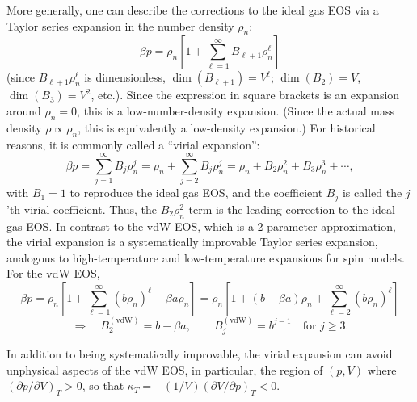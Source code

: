 More generally, one can describe the corrections to the ideal gas EOS via a Taylor series expansion in the number
density $\rho_n$:
\begin{equation}
  \beta p = \rho_n\left[1 + \sum_{\ell=1}^\infty B_{\ell+1}\rho_n^\ell\right]
\end{equation}
(since $B_{\ell+1}\rho_n^\ell$ is dimensionless, $\dim(B_{\ell+1}) = V^\ell$; $\dim(B_2) = V$, $\dim(B_3) = V^2$,
etc.). Since the expression in square brackets is an expansion around $\rho_n = 0$, this is a low-number-density
expansion. (Since the actual mass density $\rho\propto\rho_n$, this is equivalently a low-density expansion.) For
historical reasons, it is commonly called a ``virial expansion'':
\begin{equation}
  \beta p = \sum_{j=1}^\infty B_j\rho_n^j = \rho_n + \sum_{j=2}^\infty B_j\rho_n^j = \rho_n + B_2\rho_n^2 + B_3\rho_n^3 + \cdots,
\end{equation}
with $B_1 = 1$ to reproduce the ideal gas EOS, and the coefficient $B_j$ is called the $j$'th virial coefficient.
Thus, the $B_2\rho_n^2$ term is the leading correction to the ideal gas EOS. In contrast to the vdW EOS, which is a
2-parameter approximation, the virial expansion is a systematically improvable Taylor series expansion, analogous
to high-temperature and low-temperature expansions for spin models. For the vdW EOS,
\begin{equation}
  \beta p = \rho_n\left[1 + \sum_{\ell=1}^\infty(b\rho_n)^\ell - \beta a\rho_n\right]
          = \rho_n\left[1 + (b-\beta a)\rho_n + \sum_{\ell=2}^\infty(b\rho_n)^\ell\right]
\end{equation}
\begin{equation}
  \Rightarrow\quad B_2^{(\text{vdW})} = b-\beta a,\qquad B_j^{(\text{vdW})} = b^{j-1}\quad\text{for } j\ge 3 .
\end{equation}

In addition to being systematically improvable, the virial expansion can avoid unphysical aspects of the vdW EOS,
in particular, the region of $(p,V)$ where $(\partial p/\partial V)_T>0$, so that
$\kappa_T = -(1/V)\left(\partial V/\partial p\right)_T<0$.


